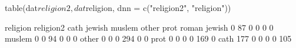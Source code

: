 \begin{Schunk}
\begin{Sinput}
 table(dat$religion2, dat$religion, dnn = c("religion2", "religion"))
\end{Sinput}
\begin{Soutput}
         religion
religion2 cath jewish muslem other prot roman
   jewish    0     87      0     0    0     0
   muslem    0      0     94     0    0     0
   other     0      0      0   294    0     0
   prot      0      0      0     0  169     0
   cath    177      0      0     0    0   105
\end{Soutput}
\end{Schunk}
